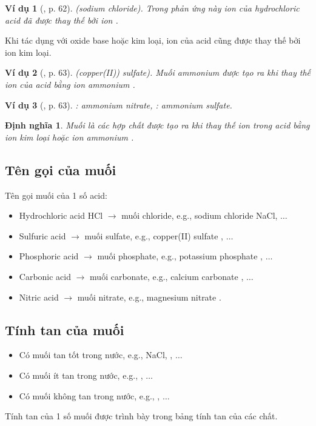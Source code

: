 \documentclass{article}
\newtheorem{dinhnghia}{Định nghĩa}
\newtheorem{vidu}{Ví dụ}
\begin{document}
\begin{vidu}[\cite{SGK_KHTN_8_Canh_Dieu}, p. 62]
	\emph{} (sodium chloride). Trong phản ứng này ion \emph{} của hydrochloric acid đã được thay thế bởi ion \emph{}.
\end{vidu}
Khi tác dụng với oxide base hoặc kim loại, ion  của acid cũng được thay thế bởi ion kim loại.

\begin{vidu}[\cite{SGK_KHTN_8_Canh_Dieu}, p. 63]
	\emph{} (copper(II)) sulfate). Muối ammonium được tạo ra khi thay thế ion \emph{} của acid bằng ion ammonium \emph{}.
\end{vidu}

\begin{vidu}[\cite{SGK_KHTN_8_Canh_Dieu}, p. 63]
	\emph{}: ammonium nitrate, \emph{}: ammonium sulfate.
\end{vidu}

\begin{dinhnghia}
	\emph{Muối} là các hợp chất được tạo ra khi thay thế ion \emph{} trong acid bằng ion kim loại hoặc ion ammonium \emph{}.
\end{dinhnghia}

\subsection{Tên gọi của muối}
Tên gọi muối của 1 số acid:
\begin{itemize}
	\item Hydrochloric acid HCl $\to$ muối chloride, e.g., sodium chloride NaCl, $\ldots$
	\item Sulfuric acid  $\to$ muối sulfate, e.g., copper(II) sulfate , $\ldots$
	\item Phosphoric acid  $\to$ muối phosphate, e.g., potassium phosphate , $\ldots$
	\item Carbonic acid  $\to$ muối carbonate, e.g., calcium carbonate , $\ldots$
	\item Nitric acid  $\to$ muối nitrate, e.g., magnesium nitrate .
\end{itemize}

\subsection{Tính tan của muối}
\begin{itemize}
	\item Có muối tan tốt trong nước, e.g., NaCl, , $\ldots$
	\item Có muối ít tan trong nước, e.g., , $\ldots$
	\item Có muối không tan trong nước, e.g., , $\ldots$
\end{itemize}
Tính tan của 1 số muối được trình bày trong bảng tính tan của các chất.
\end{document}
